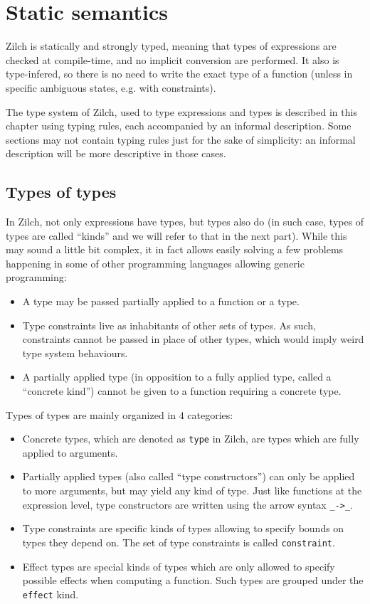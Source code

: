 \chapter{Static semantics}\label{chap:zilch-staticsem}

Zilch is statically and strongly typed, meaning that types of expressions are checked at compile-time, and no implicit conversion are performed.
It also is type-infered, so there is no need to write the exact type of a function (unless in specific ambiguous states, e.g. with constraints).

The type system of Zilch, used to type expressions and types is described in this chapter using typing rules, each accompanied by an informal description.
Some sections may not contain typing rules just for the sake of simplicity: an informal description will be more descriptive in those cases.

\section{Types of types}\label{sec:zilch-staticsem-types}

In Zilch, not only expressions have types, but types also do (in such case, types of types are called “kinds” and we will refer to that in the next part).
While this may sound a little bit complex, it in fact allows easily solving a few problems happening in some of other programming languages allowing generic programming:
\begin{itemize}
	\item A type may be passed partially applied to a function or a type.
	\item Type constraints live as inhabitants of other sets of types.
	      As such, constraints cannot be passed in place of other types, which would imply weird type system behaviours.
	\item A partially applied type (in opposition to a fully applied type, called a ``concrete kind'') cannot be given to a function requiring a concrete type.
\end{itemize}

Types of types are mainly organized in 4 categories:
\begin{itemize}
	\item Concrete types, which are denoted as \verb|type| in Zilch, are types which are fully applied to arguments.
	\item Partially applied types (also called ``type constructors'') can only be applied to more arguments, but may yield any kind of type.
	      Just like functions at the expression level, type constructors are written using the arrow syntax \verb|_->_|.
	\item Type constraints are specific kinds of types allowing to specify bounds on types they depend on.
	      The set of type constraints is called \verb|constraint|.
	\item Effect types are special kinds of types which are only allowed to specify possible effects when computing a function.
	      Such types are grouped under the \verb|effect| kind.
\end{itemize}

